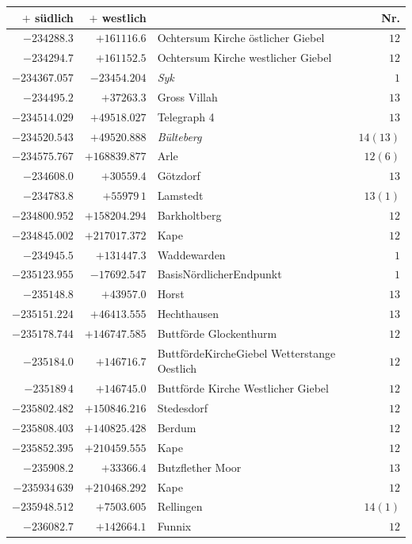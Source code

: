 \begin{center}\begingroup\fontsize{8}{9}\selectfont
\setlength{\tabcolsep}{4pt}
\begin{tabular}{r|r|p{170pt}|r}\hline
\(+\) südlich&\(+\) westlich&&Nr.\\\hline
\(-234288.3\)&\(+161116.6\)&Ochtersum Kirche östlicher Giebel&\(12\)\\
\(-234294.7\)&\(+161152.5\)&Ochtersum Kirche westlicher Giebel&\(12\)\\
\(-234367.057\)&\(-23454.204\)&\textit{Syk}&\(1\)\\
\(-234495.2\)&\(+37263.3\)&Gross Villah&\(13\)\\
\(-234514.029\)&\(+49518.027\)&Telegraph 4&\(13\)\\
\(-234520.543\)&\(+49520.888\)&\textit{Bülteberg}&\(14(13)\)\\
\(-234575.767\)&\(+168839.877\)&Arle&\(12(6)\)\\
\(-234608.0\)&\(+30559.4\)&Götzdorf&\(13\)\\
\(-234783.8\)&\(+55979\,1\)&Lamstedt&\(13(1)\)\\
\(-234800.952\)&\(+158204.294\)&Barkholtberg&\(12\)\\
\(-234845.002\)&\(+217017.372\)&Kape&\(12\)\\
\(-234945.5\)&\(+131447.3\)&Waddewarden&\(1\)\\
\(-235123.955\)&\(-17692.547\)&BasisNördlicherEndpunkt&\(1\)\\
\(-235148.8\)&\(+43957.0\)&Horst&\(13\)\\
\(-235151.224\)&\(+46413.555\)&Hechthausen&\(13\)\\
\(-235178.744\)&\(+146747.585\)&Buttförde Glockenthurm&\(12\)\\
\(-235184.0\)&\(+146716.7\)&ButtfördeKircheGiebel Wetterstange Oestlich&\(12\)\\
\(-235189\,4\)&\(+146745.0\)&Buttförde Kirche Westlicher Giebel&\(12\)\\
\(-235802.482\)&\(+150846.216\)&Stedesdorf&\(12\)\\
\(-235808.403\)&\(+140825.428\)&Berdum&\(12\)\\
\(-235852.395\)&\(+210459.555\)&Kape&\(12\)\\
\(-235908.2\)&\(+33366.4\)&Butzflether Moor&\(13\)\\
\(-235934\,639\)&\(+210468.292\)&Kape&\(12\)\\
\(-235948.512\)&\(+7503.605\)&Rellingen&\(14(1)\)\\
\(-236082.7\)&\(+142664.1\)&Funnix&\(12\)\\

\end{tabular}
\end{center}
